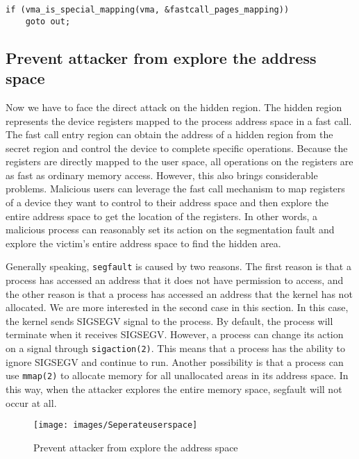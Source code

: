 \begin{lstlisting}[style=CStyle]
  if (vma_is_special_mapping(vma, &fastcall_pages_mapping))
    goto out;
\end{lstlisting}
 

\subsection{Prevent attacker from explore the address space}
Now we have to face the direct attack on the hidden region. 
The hidden region represents the device registers mapped to the
 process address space in a fast call. The fast call entry region 
 can obtain the address of a  hidden region from the secret region and
  control the device to complete specific operations. Because the 
  registers are directly mapped to the user space, all operations 
  on the registers are as fast as ordinary memory access. However, 
  this also brings considerable problems. Malicious users can 
  leverage the fast call mechanism to map registers of a device 
  they want to control to their address space and then explore the 
  entire address space to get the location of the registers. 
  In other words, a malicious process can reasonably set its 
  action on the segmentation fault and explore the victim's 
  entire address space to find the hidden area.

Generally speaking, \verb|segfault| is caused by two reasons. 
The first reason is that a process has accessed an address 
that it does not have permission to access, and the other 
reason is that a process has accessed an address that the 
kernel has not allocated. We are more interested in the 
second case in this section. In this case, the kernel sends 
SIGSEGV signal to the process. By default,  the process will 
terminate when it receives SIGSEGV.  However, a process can 
change its action on a signal through \verb|sigaction(2)|. This 
means that a process has the ability to ignore SIGSEGV 
and continue to run. Another possibility is that a process 
can use \verb|mmap(2)| to allocate memory for all unallocated 
areas in its address space. In this way, when the attacker 
explores the entire memory space, segfault will not occur at all.

\begin{figure}[H]
  \centering
  \texttt{[image: images/Seperateuserspace]}
  \caption[Short description]{Prevent attacker from explore the address space}
  \label{fig:Seperateuserspace}
\end{figure}


